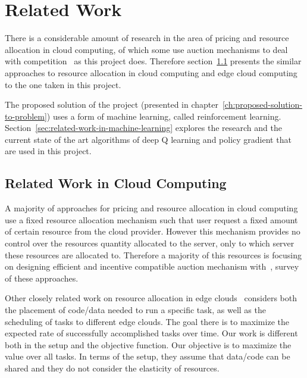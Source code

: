 \chapter{Related Work}\label{ch:background-literature}
There is a considerable amount of research in the area of pricing and resource allocation in cloud computing,
of which some use auction mechanisms to deal with competition~\citep{KUMAR2017234,Zhang2017,Du2019,Bi2019} as this
project does. Therefore section~\ref{sec:related-work-in-cloud-computing} presents the similar approaches to
resource allocation in cloud computing and edge cloud computing to the one taken in this project.

The proposed solution of the project (presented in chapter~\ref{ch:proposed-solution-to-problem}) uses a form of
machine learning, called reinforcement learning. Section~\ref{sec:related-work-in-machine-learning} explores the
research and the current state of the art algorithms of deep Q learning and policy gradient that are used in this
project.

\section{Related Work in Cloud Computing}\label{sec:related-work-in-cloud-computing}
A majority of approaches for pricing and resource allocation in cloud computing use a fixed resource allocation
mechanism such that user request a fixed amount of certain resource from the cloud provider. However this mechanism
provides no control over the resources quantity allocated to the server, only to which server these resources are
allocated to. Therefore a majority of this resources is focusing on designing efficient and incentive compatible
auction mechanism with~\cite{KUMAR2017234}, survey of these approaches.

Other closely related work on resource allocation in edge clouds~\cite{vaji_infocom} considers both the placement of
code/data needed to run a specific task, as well as the scheduling of tasks to different edge clouds. The goal there
is to maximize the expected rate of successfully accomplished tasks over time. Our work is different both in the setup
and the objective function. Our objective is to maximize the value over all tasks. In terms of the setup, they assume
that data/code can be shared and they do not consider the elasticity of resources.

